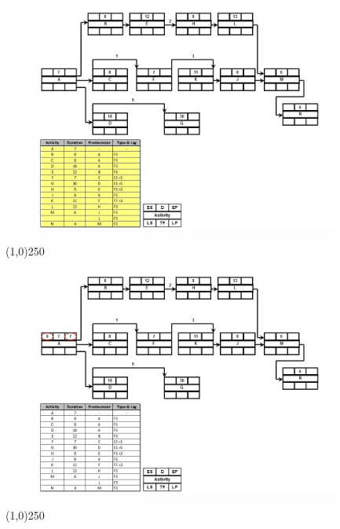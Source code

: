 \begin{frame}
\begin{figure}
	\centering
		\includegraphics[width = 10.0cm]{oldnotes/Slide200.jpg}
\end{figure}
\end{frame}
\begin{center}\line(1,0){250}\end{center}




\begin{frame}
\begin{figure}
	\centering
		\includegraphics[width = 10.0cm]{oldnotes/Slide201.jpg}
\end{figure}
\end{frame}
\begin{center}\line(1,0){250}\end{center}





